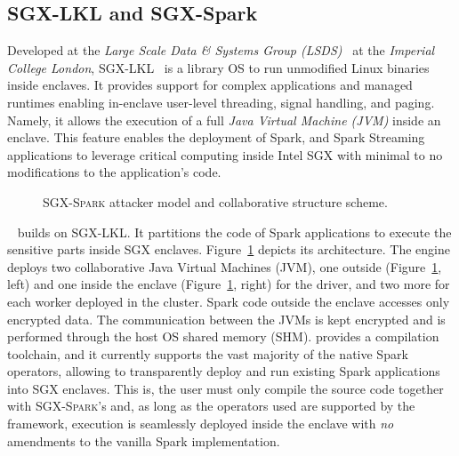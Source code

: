 \subsection{SGX-LKL and SGX-Spark}
Developed at the \textit{Large Scale Data \& Systems Group (LSDS)}~\cite{lsds} at the \textit{Imperial College London}, \textsc{SGX-LKL}~\cite{sgx-lkl} is a library OS to run unmodified Linux binaries inside enclaves.
It provides support for complex applications and managed runtimes enabling in-enclave user-level threading, signal handling, and paging.
Namely, it allows the execution of a full \textit{Java Virtual Machine (JVM)} inside an enclave. 
This feature enables the deployment of Spark, and Spark Streaming applications to leverage critical computing inside Intel SGX with minimal to no modifications to the application's code. 
\begin{figure}
    \centering
    \vspace{-21pt}
    
    \caption{\textsc{SGX-Spark} attacker model and collaborative structure scheme.\label{fig:sgx-spark-scheme}}
    \vspace{-19pt}
\end{figure}
\sgxspark~\cite{sgx-spark} builds on \textsc{SGX-LKL}.
It partitions the code of Spark applications to execute the sensitive parts inside SGX enclaves. 
Figure~\ref{fig:sgx-spark-scheme} depicts its architecture.
The engine deploys two collaborative Java Virtual Machines (JVM), one outside (Figure~\ref{fig:sgx-spark-scheme}, left) and one inside the enclave (Figure~\ref{fig:sgx-spark-scheme}, right) for the driver, and two more for each worker deployed in the cluster. 
Spark code outside the enclave accesses only encrypted data.
The communication between the JVMs is kept encrypted and is performed through the host OS shared memory (SHM).
\sgxspark provides a compilation toolchain, and it currently supports the vast majority of the native Spark operators, allowing to transparently deploy and run existing Spark applications into SGX enclaves.
This is, the user must only compile the source code together with \textsc{SGX-Spark}'s and, as long as the operators used are supported by the framework, execution is seamlessly deployed inside the enclave with \emph{no} amendments to the vanilla Spark implementation.

